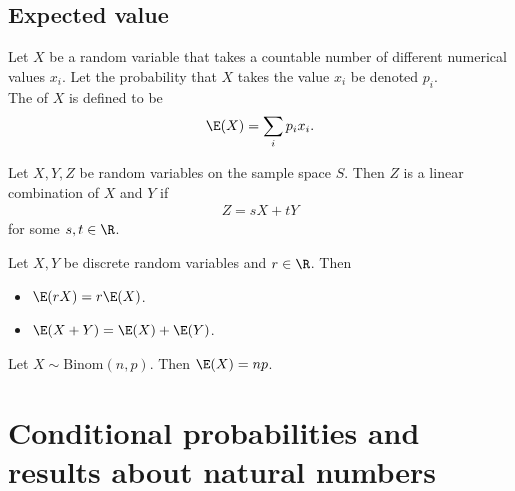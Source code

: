 \documentclass{article}
\begin{document}
\subsection{Expected value}
\begin{definition}
    Let $X$ be a random variable that takes a countable number of different
    numerical values $x_i$. Let the probability that $X$ takes the value $x_i$
    be denoted $p_i$.\\
    The  of $X$ is defined to be
    \begin{align*}
        \E(X) = \sum_i p_i x_i.
    \end{align*}
\end{definition}
\begin{definition}
    Let $X,Y,Z$ be random variables on the sample space $S$.
    Then $Z$ is a linear combination of $X$ and $Y$ if
    \begin{align*}
        Z = sX + tY
    \end{align*}
    for some $s,t\in\R$.
\end{definition}
\begin{theorem}
    Let $X,Y$ be discrete random variables and $r\in\R$. Then
    \begin{itemize}
        \item $\E(rX)=r\E(X)$.
        \item $\E(X + Y) = \E(X) + \E(Y)$.
    \end{itemize}
\end{theorem}
\begin{proposition}
    Let $X\sim\text{Binom}(n,p)$. Then $\E(X)=np$.
\end{proposition}
\section{Conditional probabilities and results about natural numbers}
\end{document}
